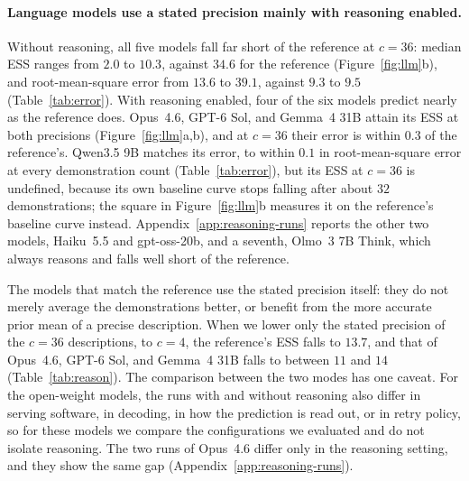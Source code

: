 \documentclass{article}
\theoremstyle{definition}
\begin{document}
\paragraph{Language models use a stated precision mainly with reasoning enabled.}\label{sec:once}\label{sec:reasoning}
Without reasoning, all five models fall far short of the reference at $c=36$: median ESS ranges from $2.0$ to $10.3$, against $34.6$ for the reference (Figure~\ref{fig:llm}b), and root-mean-square error from $13.6$ to $39.1$, against $9.3$ to $9.5$ (Table~\ref{tab:error}). With reasoning enabled, four of the six models predict nearly as the reference does. Opus~4.6, GPT-6 Sol, and Gemma~4 31B attain its ESS at both precisions (Figure~\ref{fig:llm}a,b), and at $c=36$ their error is within $0.3$ of the reference's. Qwen3.5 9B matches its error, to within $0.1$ in root-mean-square error at every demonstration count (Table~\ref{tab:error}), but its ESS at $c=36$ is undefined, because its own baseline curve stops falling after about $32$ demonstrations; the square in Figure~\ref{fig:llm}b measures it on the reference's baseline curve instead. Appendix~\ref{app:reasoning-runs} reports the other two models, Haiku~5.5 and gpt-oss-20b, and a seventh, Olmo~3 7B Think, which always reasons and falls well short of the reference.

The models that match the reference use the stated precision itself: they do not merely average the demonstrations better, or benefit from the more accurate prior mean of a precise description. When we lower only the stated precision of the $c=36$ descriptions, to $c=4$, the reference's ESS falls to $13.7$, and that of Opus~4.6, GPT-6 Sol, and Gemma~4 31B falls to between $11$ and $14$ (Table~\ref{tab:reason}). The comparison between the two modes has one caveat. For the open-weight models, the runs with and without reasoning also differ in serving software, in decoding, in how the prediction is read out, or in retry policy, so for these models we compare the configurations we evaluated and do not isolate reasoning. The two runs of Opus~4.6 differ only in the reasoning setting, and they show the same gap (Appendix~\ref{app:reasoning-runs}).
\end{document}
